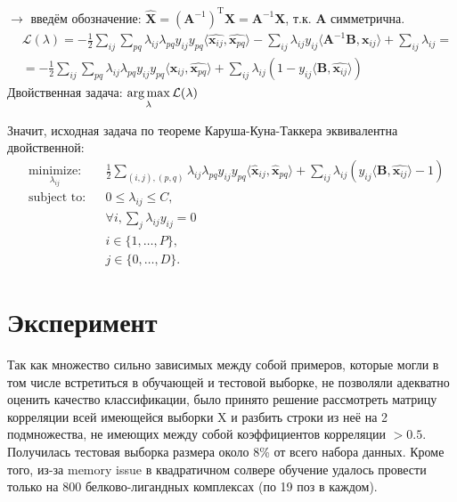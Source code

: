 \documentclass[12pt,twoside]{article}
\begin{document}
$\rightarrow$ введём обозначение:
$\widehat{\mathbf{X}} = (\mathbf{A}^{-1})^{\text{T}}\mathbf{X} = \mathbf{A}^{-1}\mathbf{X}$, т.к. $ \mathbf{A}$ симметрична.
\begin{equation}
\begin{aligned}
& \mathcal{L}(\lambda) = - \frac{1}{2} \sum_{ij}\sum_{pq} {\lambda_{ij}\lambda_{pq}y_{ij}y_{pq}\langle \widehat{\mathbf{x}_{ij}}, \widehat{\mathbf{x}_{pq}} \rangle} - 
\sum_{ij}{\lambda_{ij}y_{ij}\langle \mathbf{A}^{-1}\mathbf{B}, \mathbf{x}_{ij} \rangle} + \sum_{ij}{\lambda_{ij}} = \\
& = - \frac{1}{2} \sum_{ij}\sum_{pq} {\lambda_{ij}\lambda_{pq}y_{ij}y_{pq}\langle \widehat{\mathbf{x}_{ij}}, \widehat{\mathbf{x}_{pq}}  \rangle} + 
\sum_{ij}{\lambda_{ij} \left(1  - y_{ij}\langle \mathbf{B}, \widehat{\mathbf{x}_{ij}} \rangle \right)}
\end{aligned}
\end{equation}
Двойственная задача: $\argmax_{\lambda} \mathcal{L}(\lambda)$

Значит, исходная задача по теореме Каруша-Куна-Таккера эквивалентна двойственной:
\begin{equation}\label{eq19}
\begin{aligned}
& \underset{\lambda_{ij}}{\text{minimize:}}
& & \frac{1}{2}\sum\limits_{(i,j),(p,q)}\lambda_{ij}\lambda_{pq}y_{ij}y_{pq}\langle \widehat{\mathbf{x}}_{ij},\widehat{\mathbf{x}}_{pq}\rangle + \sum_{ij}{\lambda_{ij} \left(y_{ij}\langle \mathbf{B}, \widehat{\mathbf{x}_{ij}} \rangle - 1 \right)} \\
& \text{subject to:}
& & 0\leq\lambda_{ij} \leq C, \\
&&& \forall i, \sum_j{\lambda_{ij}y_{ij}} = 0 \\
&&&i\in\{1,\dots,P\}, \\
&&&j\in\{0,\dots,D\}.
\end{aligned}
\end{equation}

\section{Эксперимент}

Так как множество сильно зависимых между собой примеров, которые могли в том числе встретиться в обучающей и тестовой выборке, не позволяли адекватно оценить качество классификации, было принято решение рассмотреть матрицу корреляции всей имеющейся выборки X и разбить строки из неё на 2 подмножества, не имеющих между собой коэффициентов корреляции $> 0.5$. Получилась тестовая выборка размера около 8\% от всего набора данных.
Кроме того, из-за memory issue в квадратичном солвере обучение удалось провести только на 800 белково-лигандных комплексах (по 19 поз в каждом).
\end{document}
